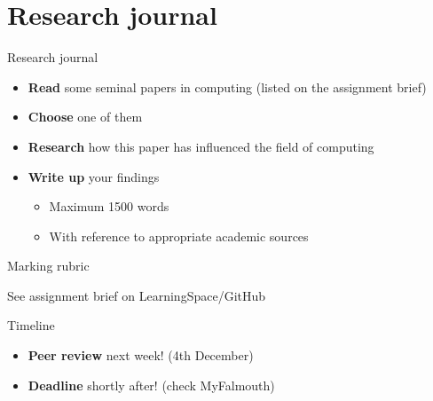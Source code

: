 \part{Research journal}
\frame{\partpage}

\begin{frame}{Research journal}
    \begin{itemize}
        \pause\item \textbf{Read} some seminal papers in computing (listed on the assignment brief)
        \pause\item \textbf{Choose} one of them
        \pause\item \textbf{Research} how this paper has influenced the field of computing
        \pause\item \textbf{Write up} your findings
        \begin{itemize}
            \pause\item Maximum 1500 words
            \pause\item With reference to appropriate academic sources
        \end{itemize}
    \end{itemize}
\end{frame}

\begin{frame}{Marking rubric}
    \begin{center}
        See assignment brief on LearningSpace/GitHub
    \end{center}
\end{frame}

\begin{frame}{Timeline}
    \begin{itemize}
        \item \textbf{Peer review} next week! (4th December)
        \item \textbf{Deadline} shortly after! (check MyFalmouth)
    \end{itemize}
\end{frame}

